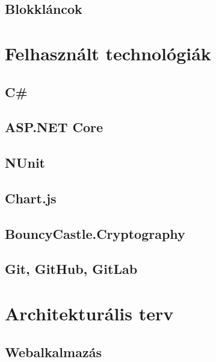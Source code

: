 \documentclass[12pt]{report} %
\begin{document}
\section{Blokkláncok} %

\chapter{Felhasznált technológiák} %

\section{C\#} %

\section{ASP.NET Core} %

\section{NUnit} %

\section{Chart.js} %

\section{BouncyCastle.Cryptography} %

\section{Git, GitHub, GitLab} %

\chapter{Architekturális terv} %

\section{Webalkalmazás} %
\end{document}
